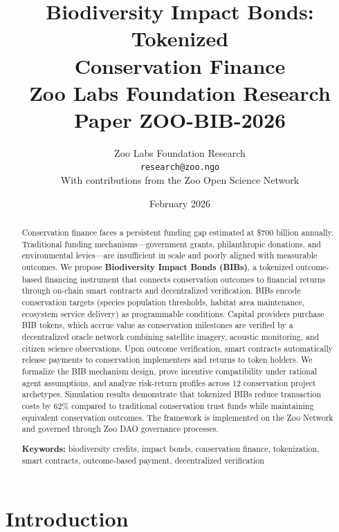 \documentclass[11pt,a4paper]{article}
\title{%
  \textbf{Biodiversity Impact Bonds: Tokenized\\Conservation Finance}\\[0.5em]
  \large Zoo Labs Foundation Research Paper ZOO-BIB-2026
}
\author{
  Zoo Labs Foundation Research\\
  \texttt{research@zoo.ngo}\\[0.5em]
  \small With contributions from the Zoo Open Science Network
}
\date{February 2026}
\begin{document}
\maketitle

\begin{abstract}
\noindent
Conservation finance faces a persistent funding gap estimated at
\$700 billion annually. Traditional funding mechanisms---government
grants, philanthropic donations, and environmental levies---are
insufficient in scale and poorly aligned with measurable outcomes. We
propose \textbf{Biodiversity Impact Bonds (BIBs)}, a tokenized
outcome-based financing instrument that connects conservation outcomes
to financial returns through on-chain smart contracts and decentralized
verification. BIBs encode conservation targets (species population
thresholds, habitat area maintenance, ecosystem service delivery) as
programmable conditions. Capital providers purchase BIB tokens, which
accrue value as conservation milestones are verified by a decentralized
oracle network combining satellite imagery, acoustic monitoring, and
citizen science observations. Upon outcome verification, smart contracts
automatically release payments to conservation implementers and returns
to token holders. We formalize the BIB mechanism design, prove incentive
compatibility under rational agent assumptions, and analyze risk-return
profiles across 12 conservation project archetypes. Simulation results
demonstrate that tokenized BIBs reduce transaction costs by 62\%
compared to traditional conservation trust funds while maintaining
equivalent conservation outcomes. The framework is implemented on the
Zoo Network and governed through Zoo DAO governance processes.

\medskip
\noindent\textbf{Keywords:} biodiversity credits, impact bonds,
conservation finance, tokenization, smart contracts, outcome-based
payment, decentralized verification
\end{abstract}

\newpage
\tableofcontents
\newpage

\section{Introduction}
\label{sec:introduction}
\end{document}

